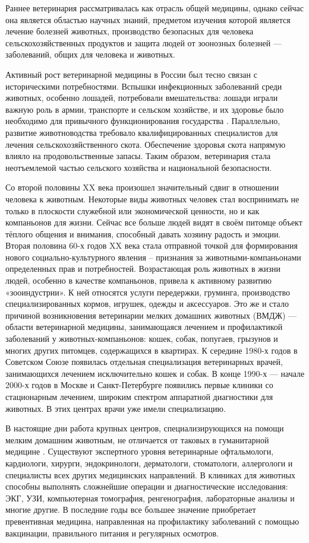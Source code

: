 \documentclass[a4paper]{article}
\begin{document}
Раннее ветеринария рассматривалась как отрасль общей медицины, однако сейчас она является областью научных знаний, предметом изучения которой является лечение болезней животных, производство безопасных для человека сельскохозяйственных продуктов и защита людей от зоонозных болезней  — заболеваний, общих для человека и животных.

Активный рост ветеринарной медицины в России был тесно связан с историческими потребностями. Вспышки инфекционных заболеваний среди животных, особенно лошадей, потребовали вмешательства: лошади играли важную роль в армии, транспорте и сельском хозяйстве, и их здоровье было необходимо для привычного функционирования государства \cite{vetmed}. Параллельно, развитие животноводства требовало квалифицированных специалистов для лечения сельскохозяйственного скота. Обеспечение здоровья скота напрямую влияло на продовольственные запасы. Таким образом, ветеринария стала неотъемлемой частью сельского хозяйства и национальной безопасности.

Со второй половины XX века произошел значительный сдвиг в отношении человека к животным.  Некоторые виды животных человек стал воспринимать не только в плоскости служебной или экономической ценности, но и как компаньонов для жизни. Сейчас все больше людей видят в своём питомце объект тёплого общения и внимания, способный давать хозяину радость и эмоции. Вторая половина 60-х годов XX века стала отправной точкой для формирования нового социально-культурного явления – признания за животными-компаньонами определенных прав и потребностей.
Возрастающая роль животных в жизни людей, особенно в качестве компаньонов, привела к активному развитию «зооиндустрии». К ней относятся услуги передержки, груминга, производство специализированных кормов, игрушек, одежды и аксессуаров. Это же и стало причиной возникновения ветеринарии мелких домашних животных (ВМДЖ) — области ветеринарной медицины, занимающаяся лечением и профилактикой заболеваний у животных-компаньонов: кошек, собак, попугаев, грызунов и многих других питомцев, содержащихся в квартирах. 
К середине 1980-х годов в Советском Союзе появилась отдельная специализация ветеринарных врачей, занимающихся лечением исключительно кошек и собак. В конце 1990-х — начале 2000-х годов в Москве и Санкт-Петербурге появились первые клиники со стационарным лечением, широким спектром аппаратной диагностики для животных. В этих центрах врачи уже имели специализацию.

В настоящие дни работа крупных центров, специализирующихся на помощи мелким домашним животным, не отличается от таковых в гуманитарной медицине \cite{gost}. Существуют экспертного уровня ветеринарные офтальмологи, кардиологи, хирурги, эндокринологи, дерматологи, стоматологи, аллергологи и специалисты всех других медицинских направлений. В клиниках для животных способны выполнять сложнейшие операции и диагностические исследования: ЭКГ, УЗИ, компьютерная томография, ренгенография, лабораторные анализы и многие другие. В последние годы все большее значение приобретает превентивная медицина, направленная на профилактику заболеваний с помощью вакцинации, правильного питания и регулярных осмотров.
\end{document}
